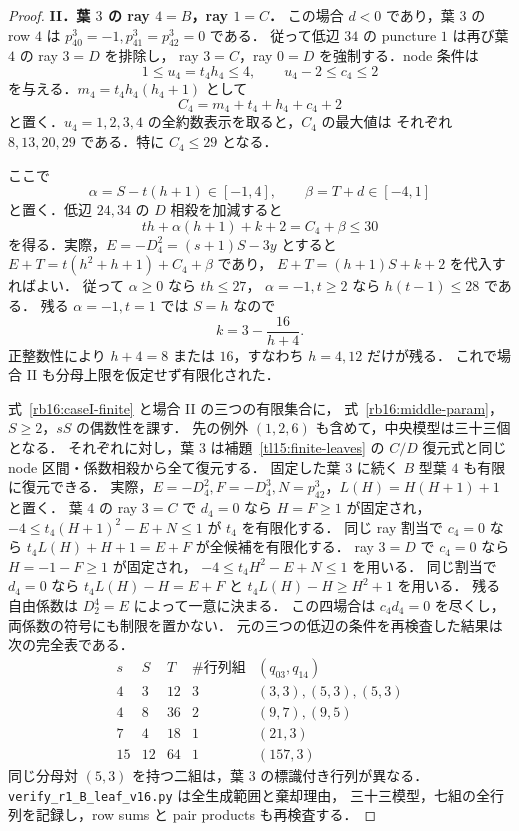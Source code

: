 \begin{proof}
\smallskip\noindent
\textbf{II．葉 $3$ の ray $4=B$，ray $1=C$．}
この場合 $d<0$ であり，葉 $3$ の row $4$ は
$p^3_{40}=-1,p^3_{41}=p^3_{42}=0$ である．
従って低辺 $34$ の puncture $1$ は再び葉 $4$ の ray $3=D$ を排除し，
ray $3=C$，ray $0=D$ を強制する．node 条件は
\[
 1\le u_4=t_4h_4\le4,\qquad u_4-2\le c_4\le2
\]
を与える．$m_4=t_4h_4(h_4+1)$ として
\[
 C_4=m_4+t_4+h_4+c_4+2
\]
と置く．$u_4=1,2,3,4$ の全約数表示を取ると，$C_4$ の最大値は
それぞれ $8,13,20,29$ である．特に $C_4\le29$ となる．

ここで
\[
 \alpha=S-t(h+1)\in[-1,4],\qquad \beta=T+d\in[-4,1]
\]
と置く．低辺 $24,34$ の $D$ 相殺を加減すると
\begin{equation}\label{rb16:caseII-balance}
 th+\alpha(h+1)+k+2=C_4+\beta\le30
\end{equation}
を得る．実際，$E=-D^2_4=(s+1)S-3y$ とすると
$E+T=t(h^2+h+1)+C_4+\beta$ であり，
$E+T=(h+1)S+k+2$ を代入すればよい．
従って $\alpha\ge0$ なら $th\le27$，
$\alpha=-1,t\ge2$ なら $h(t-1)\le28$ である．
残る $\alpha=-1,t=1$ では $S=h$ なので
\[
 k=3-\frac{16}{h+4}.
\]
正整数性により $h+4=8$ または $16$，すなわち $h=4,12$ だけが残る．
これで場合 II も分母上限を仮定せず有限化された．

式~\eqref{rb16:caseI-finite} と場合 II の三つの有限集合に，
式~\eqref{rb16:middle-param}，$S\ge2$，$sS$ の偶数性を課す．
先の例外 $(1,2,6)$ も含めて，中央模型は三十三個となる．
それぞれに対し，葉 $3$ は補題~\ref{tl15:finite-leaves} の
$C/D$ 復元式と同じ node 区間・係数相殺から全て復元する．
固定した葉 $3$ に続く $B$ 型葉 $4$ も有限に復元できる．
実際，$E=-D^2_4,F=-D^3_4,N=p^3_{42}$，$L(H)=H(H+1)+1$ と置く．
葉 $4$ の ray $3=C$ で $d_4=0$ なら $H=F\ge1$ が固定され，
$-4\le t_4(H+1)^2-E+N\le1$ が $t_4$ を有限化する．
同じ ray 割当で $c_4=0$ なら $t_4L(H)+H+1=E+F$ が全候補を有限化する．
ray $3=D$ で $c_4=0$ なら $H=-1-F\ge1$ が固定され，
$-4\le t_4H^2-E+N\le1$ を用いる．
同じ割当で $d_4=0$ なら $t_4L(H)-H=E+F$ と
$t_4L(H)-H\ge H^2+1$ を用いる．
残る自由係数は $D^4_2=E$ によって一意に決まる．
この四場合は $c_4d_4=0$ を尽くし，両係数の符号にも制限を置かない．
元の三つの低辺の条件を再検査した結果は次の完全表である．
\[
\begin{array}{rrr|r|l}
 s&S&T&\#\text{行列組}&(q_{03},q_{14})\\\hline
 4&3&12&3&(3,3),(5,3),(5,3)\\
 4&8&36&2&(9,7),(9,5)\\
 7&4&18&1&(21,3)\\
 15&12&64&1&(157,3)
\end{array}
\]
同じ分母対 $(5,3)$ を持つ二組は，葉 $3$ の標識付き行列が異なる．
\nolinkurl{verify_r1_B_leaf_v16.py} は全生成範囲と棄却理由，
三十三模型，七組の全行列を記録し，row sums と pair products も再検査する．
\end{proof}

